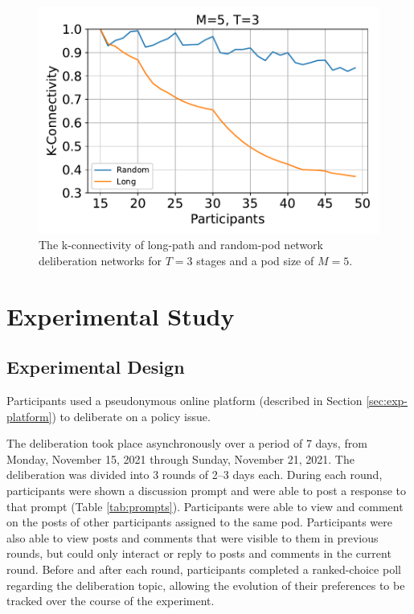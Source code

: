 \begin{figure}
\label{fig:kcon}
\center
\includegraphics[width=5in]{chapters/figures/NetDelibExp/fig-kcon}
\caption{The k-connectivity of long-path and random-pod network deliberation
networks for $T=3$ stages and a pod size of $M=5$.}
\end{figure}


\section{Experimental Study}
\label{sec:experiment}

\subsection{Experimental Design}

Participants used a pseudonymous online platform (described in Section \ref{sec:exp-platform}) to deliberate on a policy issue.

The deliberation took place asynchronously over a period of 7 days, from Monday, November 15, 2021 through Sunday, November 21, 2021.
The deliberation was divided into 3 rounds of 2--3 days each.
During each round, participants were shown a discussion prompt and were able to post a response to that prompt (Table \ref{tab:prompts}).
Participants were able to view and comment on the posts of other participants assigned to the same pod.
Participants were also able to view posts and comments that were visible to them in previous rounds, but could only interact or reply to posts and comments in the current round.
Before and after each round, participants completed a ranked-choice poll regarding the deliberation topic, allowing the evolution of their preferences to be tracked over the course of the experiment.

